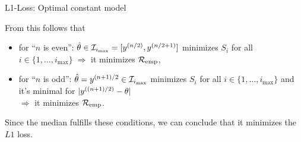 \documentclass[11pt,compress,t,notes=noshow, xcolor=table]{beamer}
\begin{document}
\begin{vbframe}{L1-Loss: Optimal constant model}
\begin{itemize}
  \framebreak 


  From this follows that
  \vspace{0.35cm}
  \begin{itemize}
  \setlength{\itemsep}{1.4em}
  \item for \enquote{$n$ is even}: $\thetah \in  \mathcal{I}_{i_{\max}} = [y^{(n/2)},y^{(n/2+1)}]$ minimizes $S_i$ for all $i \in \{1,\dots, i_{\max}\} \; \Rightarrow$  it minimizes $\riske$,
  \item for \enquote{$n$ is odd}: $\thetah = y^{(n+1)/2} \in \mathcal{I}_{i_{\max}}$ minimizes $S_i$ for all $i \in \{1,\dots, i_{\max}\}$ and it's minimal for
  $|\yi[(n + 1)/2] - \theta|$ \\ $\Rightarrow$
  it minimizes $\riske$.
  \end{itemize}
  \vspace{0.35cm}  
  Since the median fulfills these conditions, we can conclude that it minimizes 
  the $L1$ loss.
\end{itemize}








\framebreak 

\end{vbframe}
\end{document}
